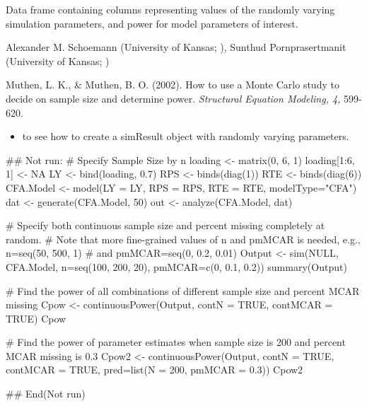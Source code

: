 \documentclass[a4paper]{book}
\begin{document}
%
\begin{Value}
Data frame containing columns representing values of the randomly varying simulation parameters, and power for model parameters of interest.
\end{Value}
%
\begin{Author}\relax
Alexander M. Schoemann (University of Kansas; ), Sunthud Pornprasertmanit (University of Kansas; )
\end{Author}
%
\begin{References}\relax
Muthen, L. K., \& Muthen, B. O. (2002). How to use a Monte Carlo study to decide on sample size and determine power. \emph{Structural Equation Modeling, 4,} 599-620.
\end{References}
%
\begin{SeeAlso}\relax
\begin{itemize}

\item {} to see how to create a simResult object with randomly varying parameters.

\end{itemize}

\end{SeeAlso}
%
\begin{Examples}
\begin{ExampleCode}
## Not run: 
# Specify Sample Size by n
loading <- matrix(0, 6, 1)
loading[1:6, 1] <- NA
LY <- bind(loading, 0.7)
RPS <- binds(diag(1))
RTE <- binds(diag(6))
CFA.Model <- model(LY = LY, RPS = RPS, RTE = RTE, modelType="CFA")
dat <- generate(CFA.Model, 50)
out <- analyze(CFA.Model, dat)

# Specify both continuous sample size and percent missing completely at random. 
# Note that more fine-grained values of n and pmMCAR is needed, e.g., n=seq(50, 500, 1) 
# and pmMCAR=seq(0, 0.2, 0.01)
Output <- sim(NULL, CFA.Model, n=seq(100, 200, 20), pmMCAR=c(0, 0.1, 0.2))
summary(Output)

# Find the power of all combinations of different sample size and percent MCAR missing
Cpow <- continuousPower(Output, contN = TRUE, contMCAR = TRUE)
Cpow

# Find the power of parameter estimates when sample size is 200 and percent MCAR missing is 0.3
Cpow2 <- continuousPower(Output, contN = TRUE, contMCAR = TRUE, pred=list(N = 200, pmMCAR = 0.3))
Cpow2

## End(Not run)
\end{ExampleCode}
\end{Examples}
\end{document}
